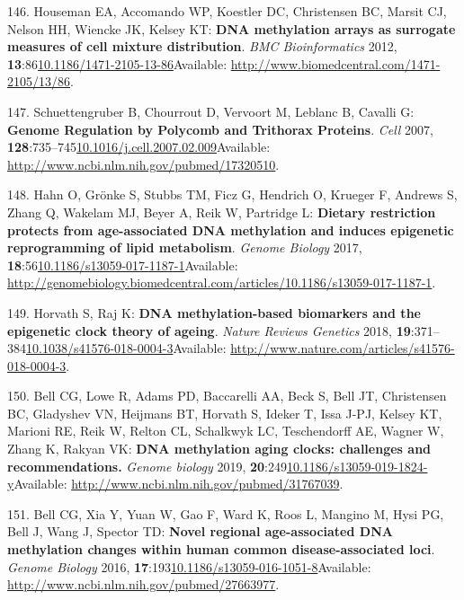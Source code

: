 \documentclass[
]{book}
\begin{document}
\leavevmode\hypertarget{ref-Houseman2012}{}%
146. Houseman EA, Accomando WP, Koestler DC, Christensen BC, Marsit CJ, Nelson HH, Wiencke JK, Kelsey KT: \textbf{DNA methylation arrays as surrogate measures of cell mixture distribution}. \emph{BMC Bioinformatics} 2012, \textbf{13}:86\href{https://doi.org/10.1186/1471-2105-13-86}{10.1186/1471-2105-13-86}Available: \url{http://www.biomedcentral.com/1471-2105/13/86}.

\leavevmode\hypertarget{ref-Schuettengruber2017}{}%
147. Schuettengruber B, Chourrout D, Vervoort M, Leblanc B, Cavalli G: \textbf{Genome Regulation by Polycomb and Trithorax Proteins}. \emph{Cell} 2007, \textbf{128}:735--745\href{https://doi.org/10.1016/j.cell.2007.02.009}{10.1016/j.cell.2007.02.009}Available: \url{http://www.ncbi.nlm.nih.gov/pubmed/17320510}.

\leavevmode\hypertarget{ref-Hahn2017}{}%
148. Hahn O, Grönke S, Stubbs TM, Ficz G, Hendrich O, Krueger F, Andrews S, Zhang Q, Wakelam MJ, Beyer A, Reik W, Partridge L: \textbf{Dietary restriction protects from age-associated DNA methylation and induces epigenetic reprogramming of lipid metabolism}. \emph{Genome Biology} 2017, \textbf{18}:56\href{https://doi.org/10.1186/s13059-017-1187-1}{10.1186/s13059-017-1187-1}Available: \url{http://genomebiology.biomedcentral.com/articles/10.1186/s13059-017-1187-1}.

\leavevmode\hypertarget{ref-Horvath2018}{}%
149. Horvath S, Raj K: \textbf{DNA methylation-based biomarkers and the epigenetic clock theory of ageing}. \emph{Nature Reviews Genetics} 2018, \textbf{19}:371--384\href{https://doi.org/10.1038/s41576-018-0004-3}{10.1038/s41576-018-0004-3}Available: \url{http://www.nature.com/articles/s41576-018-0004-3}.

\leavevmode\hypertarget{ref-Bell2019}{}%
150. Bell CG, Lowe R, Adams PD, Baccarelli AA, Beck S, Bell JT, Christensen BC, Gladyshev VN, Heijmans BT, Horvath S, Ideker T, Issa J-PJ, Kelsey KT, Marioni RE, Reik W, Relton CL, Schalkwyk LC, Teschendorff AE, Wagner W, Zhang K, Rakyan VK: \textbf{DNA methylation aging clocks: challenges and recommendations.} \emph{Genome biology} 2019, \textbf{20}:249\href{https://doi.org/10.1186/s13059-019-1824-y}{10.1186/s13059-019-1824-y}Available: \url{http://www.ncbi.nlm.nih.gov/pubmed/31767039}.

\leavevmode\hypertarget{ref-Bell2016}{}%
151. Bell CG, Xia Y, Yuan W, Gao F, Ward K, Roos L, Mangino M, Hysi PG, Bell J, Wang J, Spector TD: \textbf{Novel regional age-associated DNA methylation changes within human common disease-associated loci}. \emph{Genome Biology} 2016, \textbf{17}:193\href{https://doi.org/10.1186/s13059-016-1051-8}{10.1186/s13059-016-1051-8}Available: \url{http://www.ncbi.nlm.nih.gov/pubmed/27663977}.
\end{document}
